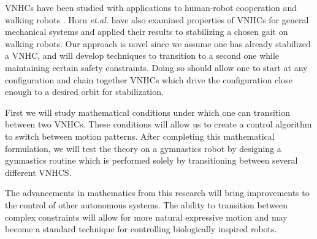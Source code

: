 \documentclass[a4paper,12pt]{article}
\begin{document}
VNHCs have been studied with applications to human-robot cooperation
\cite{vnhc-human-robot-coop} and walking robots \cite{vnhc-biped-robot}. Horn
\textit{et.al.} \cite{hybrid_zero_dynamics_bipedal_nhvcs} have also examined
properties of VNHCs for general mechanical systems and applied their results to
stabilizing a chosen gait on walking robots. Our approach is novel since we 
assume one has already stabilized a VNHC, and will develop techniques to
transition to a second one while maintaining certain safety
constraints. Doing so should allow one to start at any configuration and chain
together VNHCs which drive the configuration close enough to a desired orbit for
stabilization.

First we will study mathematical conditions under which one can transition
between two VNHCs. These conditions will allow us to create a control algorithm
to switch between motion patterns. After completing this mathematical
formulation, we will test the theory on a gymnastics robot by designing a
gymnastics routine which is performed solely by transitioning between several different
VNHCS. 

The advancements in mathematics from this research will bring improvements to
the control of other autonomous systems. The ability to transition between
complex constraints will allow for more natural expressive motion and may become
a standard technique for controlling biologically inspired robots.

\printbibliography
\end{document}
